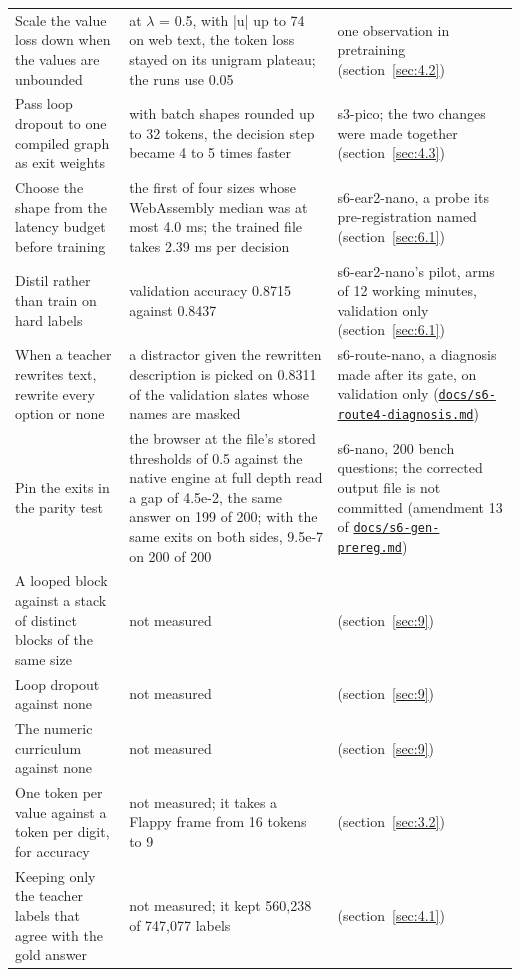 \documentclass[10pt]{article}
\begin{document}
\begin{table}[htbp]
\begin{tabularx}{\linewidth}{@{}P{4.1cm}LP{4.6cm}@{}}
Scale the value loss down when the values are unbounded & at $\lambda$ = 0.5, with |u| up to 74 on web text, the token loss stayed on its unigram plateau; the runs use 0.05 & one observation in pretraining (section~\ref{sec:4.2}) \\
Pass loop dropout to one compiled graph as exit weights & with batch shapes rounded up to 32 tokens, the decision step became 4 to 5 times faster & s3-pico; the two changes were made together (section~\ref{sec:4.3}) \\
Choose the shape from the latency budget before training & the first of four sizes whose WebAssembly median was at most 4.0 ms; the trained file takes 2.39 ms per decision & s6-ear2-nano, a probe its pre-registration named (section~\ref{sec:6.1}) \\
Distil rather than train on hard labels & validation accuracy 0.8715 against 0.8437 & s6-ear2-nano's pilot, arms of 12 working minutes, validation only (section~\ref{sec:6.1}) \\
When a teacher rewrites text, rewrite every option or none & a distractor given the rewritten description is picked on 0.8311 of the validation slates whose names are masked & s6-route-nano, a diagnosis made after its gate, on validation only (\href{https://github.com/maxgfr/skycmd/blob/main/docs/s6-route4-diagnosis.md}{\texttt{docs/\allowbreak{}s6-route4-diagnosis.md}}) \\
Pin the exits in the parity test & the browser at the file's stored thresholds of 0.5 against the native engine at full depth read a gap of 4.5e-2, the same answer on 199 of 200; with the same exits on both sides, 9.5e-7 on 200 of 200 & s6-nano, 200 bench questions; the corrected output file is not committed (amendment 13 of \href{https://github.com/maxgfr/skycmd/blob/main/docs/s6-gen-prereg.md}{\texttt{docs/\allowbreak{}s6-gen-prereg.md}}) \\
A looped block against a stack of distinct blocks of the same size & not measured & (section~\ref{sec:9}) \\
Loop dropout against none & not measured & (section~\ref{sec:9}) \\
The numeric curriculum against none & not measured & (section~\ref{sec:9}) \\
One token per value against a token per digit, for accuracy & not measured; it takes a Flappy frame from 16 tokens to 9 & (section~\ref{sec:3.2}) \\
Keeping only the teacher labels that agree with the gold answer & not measured; it kept 560,238 of 747,077 labels & (section~\ref{sec:4.1}) \\
\bottomrule
\end{tabularx}
\end{table}
\end{document}
